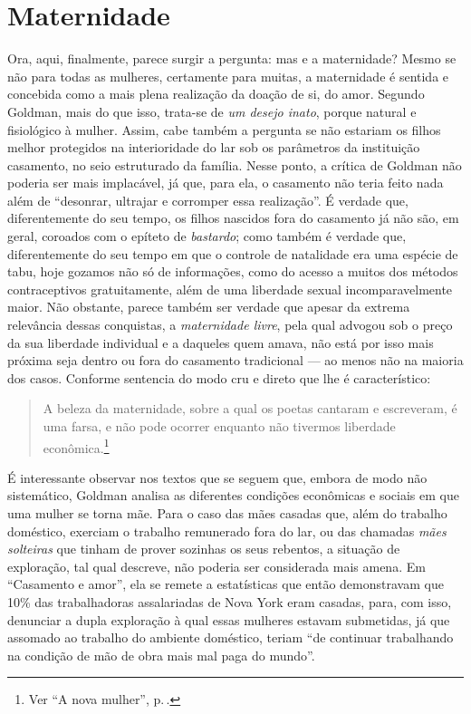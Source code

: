 \section{Maternidade}

Ora, aqui, finalmente, parece surgir a pergunta: mas e a maternidade?
Mesmo se não para todas as mulheres, certamente para muitas, a
maternidade é sentida e concebida como a mais plena realização da doação
de si, do amor. Segundo Goldman, mais do que isso, trata-se de \textit{um
desejo inato}, porque natural e fisiológico à mulher. Assim, cabe
também a pergunta se não estariam os filhos melhor protegidos na
interioridade do lar sob os parâmetros da instituição casamento, no seio
estruturado da família. Nesse ponto, a crítica de Goldman não poderia
ser mais implacável, já que, para ela, o casamento não teria feito nada
além de ``desonrar, ultrajar e corromper essa realização''. É verdade
que, diferentemente do seu tempo, os filhos nascidos fora do casamento
já não são, em geral, coroados com o epíteto de \textit{bastardo}; como
também é verdade que, diferentemente do seu tempo em que o controle de
natalidade era uma espécie de tabu, hoje gozamos não só de informações,
como do acesso a muitos dos métodos contraceptivos gratuitamente, além
de uma liberdade sexual incomparavelmente maior. Não obstante, parece
também ser verdade que apesar da extrema relevância dessas conquistas, a
\textit{maternidade livre}, pela qual advogou sob o preço da sua liberdade
individual e a daqueles quem amava, não está por isso mais próxima seja
dentro ou fora do casamento tradicional --- ao menos não na maioria dos
casos. Conforme sentencia do modo cru e direto que lhe é característico:

\begin{quote}
A beleza da maternidade, sobre a qual os poetas cantaram
e escreveram, é uma farsa, e não pode ocorrer enquanto não tivermos
liberdade econômica.\footnote{Ver ``A nova mulher'', p.\,\pageref{maternidade}.}
\end{quote}

É interessante observar nos textos que se seguem que, embora de modo não
sistemático, Goldman analisa as diferentes condições econômicas e
sociais em que uma mulher se torna mãe. Para o caso das mães casadas
que, além do trabalho doméstico, exerciam o trabalho remunerado fora do
lar, ou das chamadas \textit{mães solteiras} que tinham de prover sozinhas os
seus rebentos, a situação de exploração, tal qual descreve, não poderia
ser considerada mais amena. Em ``Casamento e amor'', ela se remete a
estatísticas que então demonstravam que 10\% das trabalhadoras
assalariadas de Nova York eram casadas, para, com isso, denunciar a
dupla exploração à qual essas mulheres estavam submetidas, já que
assomado ao trabalho do ambiente doméstico, teriam ``de continuar
trabalhando na condição de mão de obra mais mal paga do mundo''.

